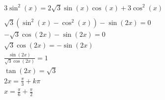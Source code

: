 \documentclass[preview,convert={density=300,outext=.png}]{standalone}
\begin{document}
\begin{align*}
    & 3\sin^2(x) = 2\sqrt{3}\sin(x)\cos(x) + 3\cos^2(x) \\
    & \\
    & \sqrt{3}(\sin^2(x) - \cos^2(x)) - \sin(2x) = 0 \\
    & -\sqrt{3}\cos(2x) - \sin(2x) = 0 \\
    & \sqrt{3}\cos(2x) = -\sin(2x) \\
    & \frac{\sin(2x)}{\sqrt{3}\cos(2x)} = 1 \\
    & \tan(2x) = \sqrt{3} \\
    & 2x = \frac{\pi}{3} + k\pi \\
    & x = \frac{\pi}{6} + \frac{\pi}{2} \\
\end{align*}
\end{document}
